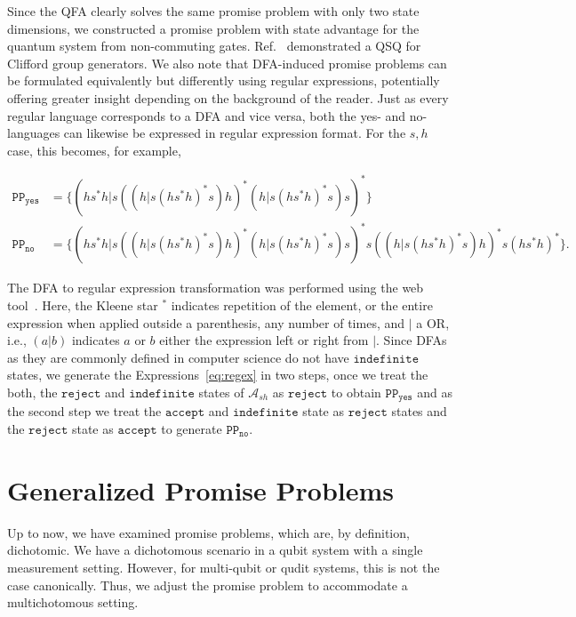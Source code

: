 \documentclass[../main.tex]{subfiles}
\begin{document}
Since the QFA clearly solves the same promise problem with only two state dimensions, we constructed a promise problem with state advantage for the quantum system from non-commuting gates. Ref.~\cite{noller2024classical} demonstrated a QSQ for Clifford group generators.
We also note that DFA-induced promise problems can be formulated equivalently but differently using regular expressions, potentially offering greater insight depending on the background of the reader. Just as every regular language corresponds to a DFA and vice versa, both the yes- and no-languages can likewise be expressed in regular expression format. For the ${s,h}$ case, this becomes, for example,

\begin{align}\label{eq:regex}
    \mathtt{PP_{yes}} &= \{(hs^*h|s((h|s(hs^*h)^*s)h)^*(h|s(hs^*h)^*s)s)^*\} \\
    \mathtt{PP_{no}} &= \{(hs^*h|s((h|s(hs^*h)^*s)h)^*(h|s(hs^*h)^*s)s)^*s((h|s(hs^*h)^*s)h)^*s(hs^*h)^*\}.
\end{align}   

The DFA to regular expression transformation was performed using the web tool~\cite{ivan2024fsm2regex}. Here, the Kleene star $^*$ indicates repetition of the element, or the entire expression when applied outside a parenthesis, any number of times, and $|$ a OR, i.e., $(a|b)$ indicates $a$ or $b$ either the expression left or right from $|$. Since DFAs as they are commonly defined in computer science do not have $\mathtt{indefinite}$ states, we generate the Expressions~\ref{eq:regex} in two steps, once we treat the both, the $\mathtt{reject}$  and $\mathtt{indefinite}$ states of $\mathcal{A}_{sh}$ as $\mathtt{reject}$  to obtain $\mathtt{PP_{yes}}$ and as the second step we treat the $\mathtt{accept}$ and $\mathtt{indefinite}$ state as $\mathtt{reject}$  states and the $\mathtt{reject}$  state as $\mathtt{accept}$ to generate $\mathtt{PP_{no}}$.


\section{Generalized Promise Problems}

Up to now, we have examined promise problems, which are, by definition, dichotomic. We have a dichotomous scenario in a qubit system with a single measurement setting. However, for multi-qubit or qudit systems, this is not the case canonically. Thus, we adjust the promise problem to accommodate a multichotomous setting.
\end{document}
